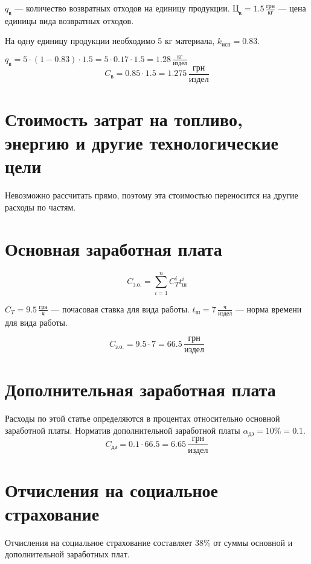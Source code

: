 \documentclass[a4paper,10pt,notitlepage,pdftex,headsepline]{scrartcl}
\begin{document}
  $q_\text{в}$ --- количество возвратных отходов на единицу продукции.
  $\text{Ц}_\text{в} = 1.5\,\frac{\text{грн}}{\text{кг}}$ --- цена единицы
  вида возвратных отходов.

  На одну единицу продукции необходимо 5 кг материала, $k_\text{исп} = 0.83$.

  $q_\text{в} = 5 \cdot \left( 1 - 0.83 \right) \cdot 1.5 = 5 \cdot 0.17 \cdot
  1.5 = 1.28\,\frac{\text{кг}}{\text{издел}}$
  \begin{equation}
    C_\text{в} = 0.85 \cdot 1.5 = 1.275\,\frac{\text{грн}}{\text{издел}}
    \label{eq:r3}
  \end{equation}
\section{Стоимость затрат на топливо, энергию и другие технологические цели}
  Невозможно рассчитать прямо, поэтому эта стоимостью переносится на другие
  расходы по частям.
\section{Основная заработная плата}
  \begin{equation}
    C_\text{з.о.} = \sum_{i = 1}^n C_T^i t_\text{ш}^i
    \label{eq:4}
  \end{equation}

  $C_T = 9.5\,\frac{\text{грн}}{\text{ч}}$ --- почасовая ставка для вида работы.
  $t_\text{ш} = 7\,\frac{\text{ч}}{\text{издел}}$ --- норма времени для вида
  работы.

  \begin{equation}
    C_\text{з.о.} = 9.5 \cdot 7 = 66.5\,\frac{\text{грн}}{\text{издел}}
    \label{eq:r4}
  \end{equation}
\section{Дополнительная заработная плата}
  Расходы по этой статье определяются в процентах относительно основной
  заработной платы.
  Норматив дополнительной заработной платы $\alpha_\text{дз} = 10\% = 0.1$.
  \begin{equation}
    C_\text{дз} = 0.1 \cdot 66.5 = 6.65\,\frac{\text{грн}}{\text{издел}}
    \label{eq:r5}
  \end{equation}
\section{Отчисления на социальное страхование}
  Отчисления на социальное страхование составляет $38\%$ от суммы основной и
  дополнительной заработных плат.
\end{document}
